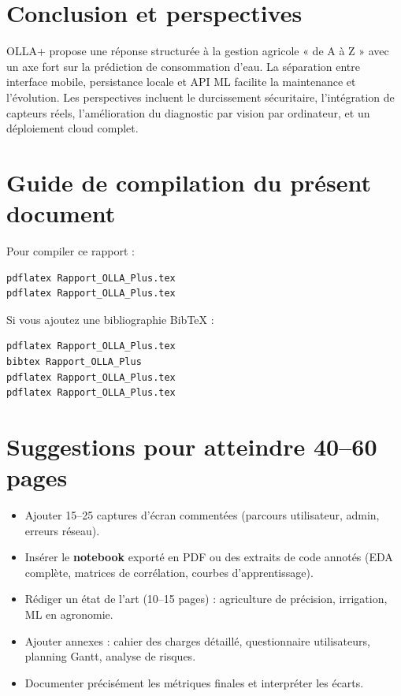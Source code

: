 \documentclass[12pt,a4paper,twoside,openright]{report}
\begin{document}
\chapter*{Conclusion et perspectives}

OLLA+ propose une réponse structurée à la gestion agricole « de A à Z » avec un axe fort sur la prédiction de consommation d'eau. La séparation entre interface mobile, persistance locale et API ML facilite la maintenance et l'évolution. Les perspectives incluent le durcissement sécuritaire, l'intégration de capteurs réels, l'amélioration du diagnostic par vision par ordinateur, et un déploiement cloud complet.

\cleardoublepage

\appendix
\chapter{Guide de compilation du présent document}

Pour compiler ce rapport :
\begin{verbatim}
pdflatex Rapport_OLLA_Plus.tex
pdflatex Rapport_OLLA_Plus.tex
\end{verbatim}

Si vous ajoutez une bibliographie Bib\TeX{} :
\begin{verbatim}
pdflatex Rapport_OLLA_Plus.tex
bibtex Rapport_OLLA_Plus
pdflatex Rapport_OLLA_Plus.tex
pdflatex Rapport_OLLA_Plus.tex
\end{verbatim}

\chapter{Suggestions pour atteindre 40--60 pages}

\begin{itemize}
  \item Ajouter 15--25 captures d'écran commentées (parcours utilisateur, admin, erreurs réseau).
  \item Insérer le \textbf{notebook} exporté en PDF ou des extraits de code annotés (EDA complète, matrices de corrélation, courbes d'apprentissage).
  \item Rédiger un état de l'art (10--15 pages) : agriculture de précision, irrigation, ML en agronomie.
  \item Ajouter annexes : cahier des charges détaillé, questionnaire utilisateurs, planning Gantt, analyse de risques.
  \item Documenter précisément les métriques finales et interpréter les écarts.
\end{itemize}
\end{document}
